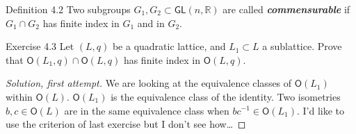 \begin{idea7}{Definition 4.2}\leavevmode
	Two subgroups $G_1,G_2\subset \mathsf{GL}(n,\mathbb{R})$ are called \textit{\textbf{commensurable}} if $G_1\cap G_2$ has finite index in $G_1$ and in $G_2$.
\end{idea7}


\begin{idea8}{Exercise 4.3}\leavevmode
	Let $(L,q)$ be a quadratic lattice, and $L_1\subset L$ a sublattice. Prove that $\mathsf{O}(L_1,q) \cap \mathsf{O}(L,q)$ has finite index in $\mathsf{O}(L,q)$.
\end{idea8}

\begin{proof}[Solution, first attempt]


	We are looking at the equivalence classes of $\mathsf{O}(L_1)$ within $\mathsf{O}(L)$. $\mathsf{O}(L_1)$ is the equivalence class of the identity. Two isometries $b,c\in\mathsf{O}(L)$ are in the same equivalence class when $bc^{-1} \in\mathsf{O}(L_1)$. {\color{2}I'd like to use the criterion of last exercise but I don't see how…}
\end{proof}

